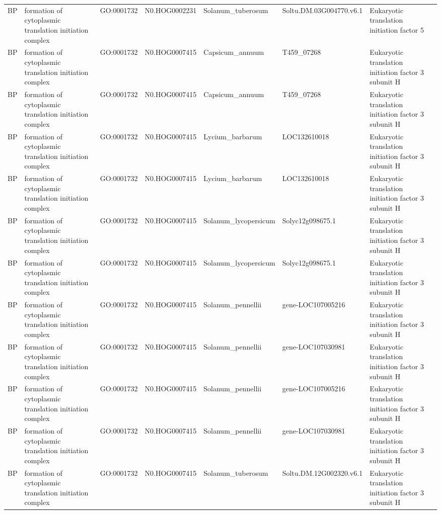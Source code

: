 \begin{table}
\begin{tabular}[t]{lllllll}
BP & formation of cytoplasmic translation initiation complex & GO:0001732 & N0.HOG0002231 & Solanum\_tuberosum & Soltu.DM.03G004770.v6.1 & Eukaryotic translation initiation factor 5\\
BP & formation of cytoplasmic translation initiation complex & GO:0001732 & N0.HOG0007415 & Capsicum\_annuum & T459\_07268 & Eukaryotic translation initiation factor 3 subunit H\\
BP & formation of cytoplasmic translation initiation complex & GO:0001732 & N0.HOG0007415 & Capsicum\_annuum & T459\_07268 & Eukaryotic translation initiation factor 3 subunit H\\
BP & formation of cytoplasmic translation initiation complex & GO:0001732 & N0.HOG0007415 & Lycium\_barbarum & LOC132610018 & Eukaryotic translation initiation factor 3 subunit H\\
BP & formation of cytoplasmic translation initiation complex & GO:0001732 & N0.HOG0007415 & Lycium\_barbarum & LOC132610018 & Eukaryotic translation initiation factor 3 subunit H\\
BP & formation of cytoplasmic translation initiation complex & GO:0001732 & N0.HOG0007415 & Solanum\_lycopersicum & Solyc12g098675.1 & Eukaryotic translation initiation factor 3 subunit H\\
BP & formation of cytoplasmic translation initiation complex & GO:0001732 & N0.HOG0007415 & Solanum\_lycopersicum & Solyc12g098675.1 & Eukaryotic translation initiation factor 3 subunit H\\
BP & formation of cytoplasmic translation initiation complex & GO:0001732 & N0.HOG0007415 & Solanum\_pennellii & gene-LOC107005216 & Eukaryotic translation initiation factor 3 subunit H\\
BP & formation of cytoplasmic translation initiation complex & GO:0001732 & N0.HOG0007415 & Solanum\_pennellii & gene-LOC107030981 & Eukaryotic translation initiation factor 3 subunit H\\
BP & formation of cytoplasmic translation initiation complex & GO:0001732 & N0.HOG0007415 & Solanum\_pennellii & gene-LOC107005216 & Eukaryotic translation initiation factor 3 subunit H\\
BP & formation of cytoplasmic translation initiation complex & GO:0001732 & N0.HOG0007415 & Solanum\_pennellii & gene-LOC107030981 & Eukaryotic translation initiation factor 3 subunit H\\
BP & formation of cytoplasmic translation initiation complex & GO:0001732 & N0.HOG0007415 & Solanum\_tuberosum & Soltu.DM.12G002320.v6.1 & Eukaryotic translation initiation factor 3 subunit H\\

\end{tabular}
\end{table}
